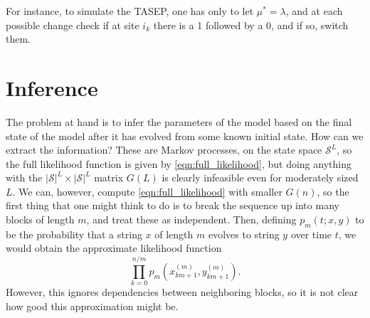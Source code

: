 \documentclass{article}
\newcommand{\calS}{\mathcal{S}}  %
\theoremstyle{plain}
\theoremstyle{definition}
\begin{document}
For instance, to simulate the TASEP, one has only to let $\mu^*=\lambda$,
and at each possible change
check if at site $i_k$ there is a 1 followed by a 0,
and if so, switch them.


\section{Inference}


The problem at hand is to infer the parameters of the model based on the final state of the model after it has evolved from some known initial state.
How can we extract the information?
These are Markov processes, on the state space $\calS^L$,
so the full likelihood function is given by \eqref{eqn:full_likelihood},
but doing anything with the $|\calS|^L \times |\calS|^L$ matrix $G(L)$
is clearly infeasible even for moderately sized $L$.
We can, however, compute \eqref{eqn:full_likelihood} with smaller $G(n)$,
so the first thing that one might think to do is to break the sequence up into many blocks of length $m$,
and treat these as independent.
Then, defining $p_m(t;x,y)$ to be the probability that a string $x$ of length $m$ evolves to string $y$ over time $t$,
we would obtain the approximate likelihood function
\[
  \prod_{k=0}^{n/m} p_m(x_{km+1}^{(m)},y_{km+1}^{(m)}) .
\]
However, this ignores dependencies between neighboring blocks,
so it is not clear how good this approximation might be.
\end{document}
